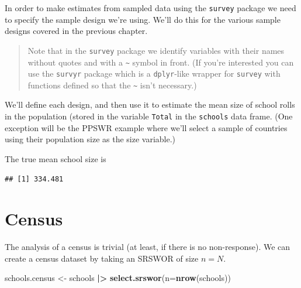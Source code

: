 \documentclass[
]{book}
\newenvironment{Shaded}{\begin{snugshade}}{\end{snugshade}}
\newcommand{\AttributeTok}[1]{\textcolor[rgb]{0.13,0.29,0.53}{#1}}
\newcommand{\FunctionTok}[1]{\textcolor[rgb]{0.13,0.29,0.53}{\textbf{#1}}}
\newcommand{\NormalTok}[1]{#1}
\newcommand{\OtherTok}[1]{\textcolor[rgb]{0.56,0.35,0.01}{#1}}
\newcommand{\SpecialCharTok}[1]{\textcolor[rgb]{0.81,0.36,0.00}{\textbf{#1}}}
\begin{document}
In order to make estimates from sampled data using the \texttt{survey} package
we need to specify the sample design we're using.
We'll do this for the various sample designs covered in the
previous chapter.

\begin{quote}
Note that in the \texttt{survey} package we identify variables with their names without
quotes and with a \texttt{\textasciitilde{}} symbol in front. (If you're interested you can
use the \texttt{survyr} package which is a \texttt{dplyr}-like wrapper for \texttt{survey}
with functions defined so that the \texttt{\textasciitilde{}} isn't necessary.)
\end{quote}

We'll define each design, and then use it to estimate the mean
size of school rolls in the population (stored in the variable \texttt{Total} in
the \texttt{schools} data frame. (One exception will be the PPSWR example
where we'll select a sample of countries using their population size
as the size variable.)

The true mean school size is

\begin{Shaded}
\end{Shaded}

\begin{verbatim}
## [1] 334.481
\end{verbatim}

\section{Census}\label{census-1}

The analysis of a census is trivial (at least, if there is no non-response).
We can create a census dataset by taking an SRSWOR of size \(n=N\).

\begin{Shaded}
\begin{Highlighting}[]
\NormalTok{schools.census }\OtherTok{\textless{}{-}}\NormalTok{ schools }\SpecialCharTok{|\textgreater{}} \FunctionTok{select.srswor}\NormalTok{(}\AttributeTok{n=}\FunctionTok{nrow}\NormalTok{(schools))}
\end{Highlighting}
\end{Shaded}
\end{document}
